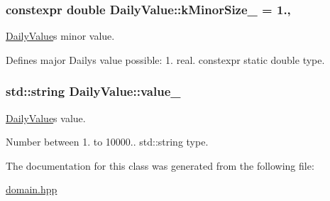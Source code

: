 \subsubsection[{\texorpdfstring{k\+Minor\+Size\+\_\+}{kMinorSize_}}]{\setlength{\rightskip}{0pt plus 5cm}constexpr double Daily\+Value\+::k\+Minor\+Size\+\_\+ = 1.\hspace{0.3cm}{\ttfamily [static]}, {\ttfamily [private]}}\hypertarget{classDailyValue_a3d11c9df8edcc21b45b1807b63cf48e0}{}\label{classDailyValue_a3d11c9df8edcc21b45b1807b63cf48e0}


\hyperlink{classDailyValue}{Daily\+Value}\textquotesingle{}s minor value. 

Defines major Daily\textquotesingle{}s value possible\+: 1. real. constexpr static double type. 
\subsubsection[{\texorpdfstring{value\+\_\+}{value_}}]{\setlength{\rightskip}{0pt plus 5cm}std\+::string Daily\+Value\+::value\+\_\+\hspace{0.3cm}{\ttfamily [private]}}\hypertarget{classDailyValue_a5021486135be58a69bd0c57c81ccb9c6}{}\label{classDailyValue_a5021486135be58a69bd0c57c81ccb9c6}


\hyperlink{classDailyValue}{Daily\+Value}\textquotesingle{}s value. 

Number between 1. to 10\textquotesingle{}000.. std\+::string type. 

The documentation for this class was generated from the following file\+:\begin{DoxyCompactItemize}
\item 
\hyperlink{domain_8hpp}{domain.\+hpp}\end{DoxyCompactItemize}
